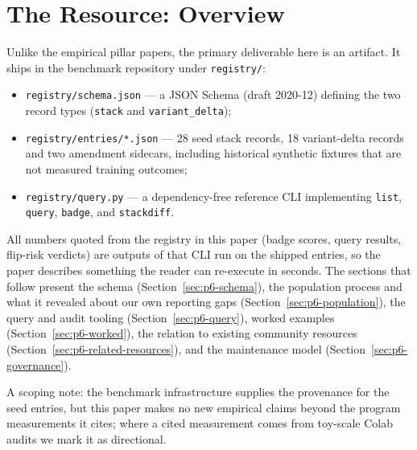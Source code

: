 \section{The Resource: Overview}
\label{sec:p6-overview}
Unlike the empirical pillar papers, the primary deliverable here is an
artifact. It ships in the benchmark repository under \texttt{registry/}:

\begin{itemize}[leftmargin=1.5em, itemsep=0.15em]
  \item \texttt{registry/schema.json} --- a JSON Schema (draft 2020-12)
        defining the two record types (\texttt{stack} and
        \texttt{variant\_delta});
  \item \texttt{registry/entries/*.json} --- 28 seed stack records, 18
        variant-delta records and two amendment sidecars, including historical
        synthetic fixtures that are not measured training outcomes;
  \item \texttt{registry/query.py} --- a dependency-free reference CLI
        implementing \texttt{list}, \texttt{query}, \texttt{badge}, and
        \texttt{stackdiff}.
\end{itemize}

All numbers quoted from the registry in this paper (badge scores, query
results, flip-risk verdicts) are outputs of that CLI run on the shipped
entries, so the paper describes something the reader can re-execute in
seconds. The sections that follow present the schema
(Section~\ref{sec:p6-schema}), the population process and what it revealed
about our own reporting gaps (Section~\ref{sec:p6-population}), the query and
audit tooling (Section~\ref{sec:p6-query}), worked examples
(Section~\ref{sec:p6-worked}), the relation to existing community resources
(Section~\ref{sec:p6-related-resources}), and the maintenance model
(Section~\ref{sec:p6-governance}).

A scoping note: the benchmark infrastructure supplies
the provenance for the seed entries, but this paper makes no new empirical
claims beyond the program measurements it cites; where a cited measurement
comes from toy-scale Colab audits we mark it as directional.
